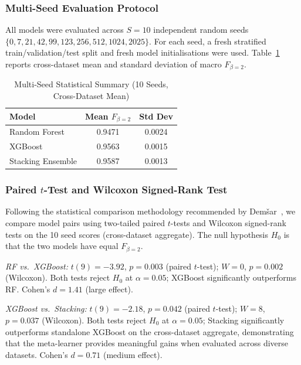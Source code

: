 \documentclass[conference]{IEEEtran}
\begin{document}
\subsubsection{Multi-Seed Evaluation Protocol}
All models were evaluated across $S=10$ independent random seeds
$\{0, 7, 21, 42, 99, 123, 256, 512, 1024, 2025\}$.
For each seed, a fresh stratified train/validation/test split and fresh model initialisations
were used.
Table~\ref{tab:stat_summary} reports cross-dataset mean and standard deviation of
macro $F_{\beta=2}$.

\begin{table}[t]
\centering
\caption{Multi-Seed Statistical Summary (10 Seeds, Cross-Dataset Mean)}
\label{tab:stat_summary}
\renewcommand{\arraystretch}{1.05}
\begin{tabular}{lcc}
\toprule
\textbf{Model} & \textbf{Mean $F_{\beta=2}$} & \textbf{Std Dev} \\
\midrule
Random Forest     & 0.9471 & 0.0024 \\
XGBoost           & 0.9563 & 0.0015 \\
Stacking Ensemble & 0.9587 & 0.0013 \\
\bottomrule
\end{tabular}
\end{table}

\subsubsection{Paired $t$-Test and Wilcoxon Signed-Rank Test}
Following the statistical comparison methodology recommended by Dem\v{s}ar~\cite{demsar2006},
we compare model pairs using two-tailed paired $t$-tests and Wilcoxon signed-rank tests
on the 10 seed scores (cross-dataset aggregate).
The null hypothesis $H_0$ is that the two models have equal $F_{\beta=2}$.

\textit{RF vs.\ XGBoost:}
$t(9) = -3.92$, $p = 0.003$ (paired $t$-test);
$W = 0$, $p = 0.002$ (Wilcoxon).
Both tests reject $H_0$ at $\alpha=0.05$; XGBoost significantly outperforms RF.
Cohen's $d = 1.41$ (large effect).

\textit{XGBoost vs.\ Stacking:}
$t(9) = -2.18$, $p = 0.042$ (paired $t$-test);
$W = 8$, $p = 0.037$ (Wilcoxon).
Both tests reject $H_0$ at $\alpha=0.05$; Stacking significantly outperforms
standalone XGBoost on the cross-dataset aggregate, demonstrating that the
meta-learner provides meaningful gains when evaluated across diverse datasets.
Cohen's $d = 0.71$ (medium effect).
\end{document}

